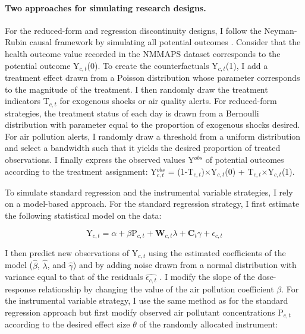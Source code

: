 \documentclass[12pt]{article}
\begin{document}
        \paragraph{Two approaches for simulating research designs.}

        \begin{sloppypar}
        For the reduced-form and regression discontinuity designs, I follow the Neyman-Rubin causal framework by simulating all potential outcomes \citep{rubin_estimating_1974}. Consider that the health outcome value recorded in the NMMAPS dataset corresponds to the potential outcome Y$_{c,t}$(0). To create the counterfactuals Y$_{c,t}$(1), I add a treatment effect drawn from a Poisson distribution whose parameter corresponds to the magnitude of the treatment. I then randomly draw the treatment indicators T$_{c,t}$ for exogenous shocks or air quality alerts. For reduced-form strategies, the treatment status of each day is drawn from a Bernoulli distribution with parameter equal to the proportion of exogenous shocks desired. For air pollution alerts, I randomly draw a threshold from a uniform distribution and select a bandwidth such that it yields the desired proportion of treated observations. I finally express the observed values Y$^{obs}$ of potential outcomes according to the treatment assignment: Y$^{obs}_{c,t}$ = (1-T$_{c,t}$)$\times$Y$_{c,t}$(0) + T$_{c,t}$$\times$Y$_{c,t}$(1).
        \end{sloppypar}
      
        To simulate standard regression and the instrumental variable strategies, I rely on a model-based approach. For the standard regression strategy, I first estimate the following statistical model on the data:
        
        \begin{equation}
        \text{Y}_{c,t} = \alpha + \beta\text{P}_{c,t} + \textbf{W}_{c,t}\lambda + \textbf{C}_{t}\gamma + \epsilon_{c,t}
        \end{equation}
        
        \noindent I then predict new observations of $\text{Y}_{c,t}$ using the estimated coefficients of the model ($\hat{\beta}$, $\hat{\lambda}$, and $\hat{\gamma}$) and by adding noise drawn from a normal distribution with variance equal to that of the residuals $\widehat{\epsilon_{c,t}}$ \citep{peng2006model}. I modify the slope of the dose-response relationship by changing the value of the air pollution coefficient $\beta$. For the instrumental variable strategy, I use the same method as for the standard regression approach but first modify observed air pollutant concentrations $\text{P}_{c,t}$ according to the desired effect size $\theta$ of the randomly allocated instrument: 
        
\end{document}
